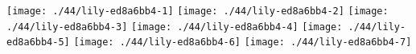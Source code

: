 \texttt{[image: ./44/lily-ed8a6bb4-1]}%
\ifx\betweenLilyPondSystem \undefined
  \linebreak
\else
  \expandafter{}%
\fi
\texttt{[image: ./44/lily-ed8a6bb4-2]}%
\ifx\betweenLilyPondSystem \undefined
  \linebreak
\else
  \expandafter{}%
\fi
\texttt{[image: ./44/lily-ed8a6bb4-3]}%
\ifx\betweenLilyPondSystem \undefined
  \linebreak
\else
  \expandafter{}%
\fi
\texttt{[image: ./44/lily-ed8a6bb4-4]}%
\ifx\betweenLilyPondSystem \undefined
  \linebreak
\else
  \expandafter{}%
\fi
\texttt{[image: ./44/lily-ed8a6bb4-5]}%
\ifx\betweenLilyPondSystem \undefined
  \linebreak
\else
  \expandafter{}%
\fi
\texttt{[image: ./44/lily-ed8a6bb4-6]}%
\ifx\betweenLilyPondSystem \undefined
  \linebreak
\else
  \expandafter{}%
\fi
\texttt{[image: ./44/lily-ed8a6bb4-7]}%
